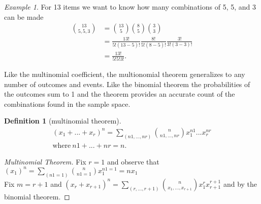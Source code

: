 \documentclass{article}
\theoremstyle{plain}
\theoremstyle{definition}
\newtheorem{definition}{Definition}
\theoremstyle{remark}
\newtheorem{example}{Example}
\begin{document}
\begin{example}
  For 13 items we want to know how many combinations of 5, 5, and 3 can be made
  \begin{align*}
    \binom{13}{5,5,3} &= \binom{13}{5}\binom{8}{5}\binom{3}{3} \\
                      &= \frac{13!}{5!(13-5)!}\frac{8!}{5!(8-5)!}\frac{3!}{3!(3-3)!} \\
                      &=\frac{13!}{5!5!3!}.
  \end{align*}
\end{example}
Like the multinomial coefficient, the multionomial theorem generalizes to any number of outcomes and events. Like the binomial theorem the probabilities of the outcomes sum to 1 and the theorem provides an accurate count of the combinations found in the sample space.
\begin{definition}[multinomial theorem]
  \begin{align*}
    (x_1+...+x_r)^n = \sum_{(n1,...,nr)}\binom{n}{n1,...,nr}x_1^{n1}...x_r^{nr} \\
    \text{where}\ n1 + ... + nr = n.
  \end{align*}
\end{definition}
\begin{proof}[Multinomial Theorem]
  Fix $r = 1$ and observe that $(x_1)^n=\sum_{(n1 = 1)}\binom{n}{n1 = 1}x_1^{n1 = 1} = nx_1$ \\
  Fix $m = r + 1$ and $(x_r + x_{r+1})^n = \sum_{(r, ..., r+1)}\binom{n}{x_1,...,x_{r+1}}x_1^rx_{r+1}^{r+1}$  and by the binomial theorem.
\end{proof}
\end{document}

